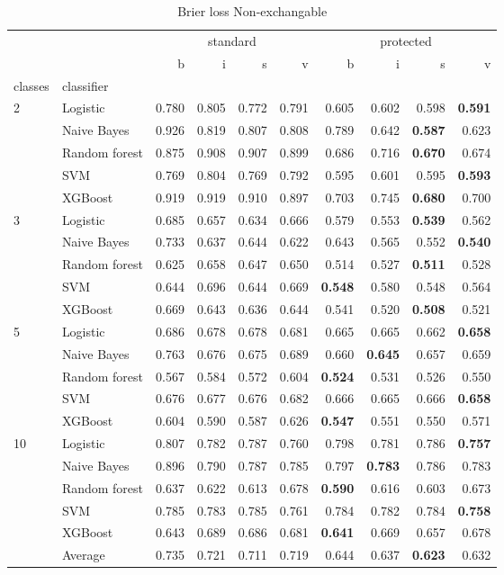 \begin{table}
\caption{Brier loss Non-exchangable}
\begin{tabular}{l|l|rrrr|rrrr}
\toprule
 &  & \multicolumn{4}{c}{standard} & \multicolumn{4}{c}{protected} \\
 &  & b & i & s & v & b & i & s & v \\
classes & classifier &  &  &  &  &  &  &  &  \\
\midrule
\midrule
\multirow[c]{5}{*}{2} & Logistic & 0.780 & 0.805 & 0.772 & 0.791 & 0.605 & 0.602 & 0.598 & \textbf{0.591} \\
 & Naive Bayes & 0.926 & 0.819 & 0.807 & 0.808 & 0.789 & 0.642 & \textbf{0.587} & 0.623 \\
 & Random forest & 0.875 & 0.908 & 0.907 & 0.899 & 0.686 & 0.716 & \textbf{0.670} & 0.674 \\
 & SVM & 0.769 & 0.804 & 0.769 & 0.792 & 0.595 & 0.601 & 0.595 & \textbf{0.593} \\
 & XGBoost & 0.919 & 0.919 & 0.910 & 0.897 & 0.703 & 0.745 & \textbf{0.680} & 0.700 \\
\midrule
\multirow[c]{5}{*}{3} & Logistic & 0.685 & 0.657 & 0.634 & 0.666 & 0.579 & 0.553 & \textbf{0.539} & 0.562 \\
 & Naive Bayes & 0.733 & 0.637 & 0.644 & 0.622 & 0.643 & 0.565 & 0.552 & \textbf{0.540} \\
 & Random forest & 0.625 & 0.658 & 0.647 & 0.650 & 0.514 & 0.527 & \textbf{0.511} & 0.528 \\
 & SVM & 0.644 & 0.696 & 0.644 & 0.669 & \textbf{0.548} & 0.580 & 0.548 & 0.564 \\
 & XGBoost & 0.669 & 0.643 & 0.636 & 0.644 & 0.541 & 0.520 & \textbf{0.508} & 0.521 \\
\midrule
\multirow[c]{5}{*}{5} & Logistic & 0.686 & 0.678 & 0.678 & 0.681 & 0.665 & 0.665 & 0.662 & \textbf{0.658} \\
 & Naive Bayes & 0.763 & 0.676 & 0.675 & 0.689 & 0.660 & \textbf{0.645} & 0.657 & 0.659 \\
 & Random forest & 0.567 & 0.584 & 0.572 & 0.604 & \textbf{0.524} & 0.531 & 0.526 & 0.550 \\
 & SVM & 0.676 & 0.677 & 0.676 & 0.682 & 0.666 & 0.665 & 0.666 & \textbf{0.658} \\
 & XGBoost & 0.604 & 0.590 & 0.587 & 0.626 & \textbf{0.547} & 0.551 & 0.550 & 0.571 \\
\midrule
\multirow[c]{5}{*}{10} & Logistic & 0.807 & 0.782 & 0.787 & 0.760 & 0.798 & 0.781 & 0.786 & \textbf{0.757} \\
 & Naive Bayes & 0.896 & 0.790 & 0.787 & 0.785 & 0.797 & \textbf{0.783} & 0.786 & 0.783 \\
 & Random forest & 0.637 & 0.622 & 0.613 & 0.678 & \textbf{0.590} & 0.616 & 0.603 & 0.673 \\
 & SVM & 0.785 & 0.783 & 0.785 & 0.761 & 0.784 & 0.782 & 0.784 & \textbf{0.758} \\
 & XGBoost & 0.643 & 0.689 & 0.686 & 0.681 & \textbf{0.641} & 0.669 & 0.657 & 0.678 \\\midrule\ & Average & 0.735 & 0.721 & 0.711 & 0.719 & 0.644 & 0.637 & \textbf{0.623} & 0.632 \\
\bottomrule
\end{tabular}
\end{table}
